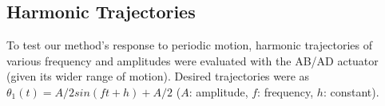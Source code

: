 \documentclass[letterpaper, 10pt, conference]{ieeeconf}      %
\begin{document}
\begin{table}[!t]
\vspace{6pt}
\caption{MSE (SDE) for Joint Angles $\theta_1$ and $\theta_2$ during Single Actuator Operation}
\vspace{-6pt}
\label{table:mse_1}
\vspace{-6pt}
\end{table}


\begin{table}[!t]
\vspace{4pt}
\caption{MSE (SDE) for Joint Angles $\theta_1$ and $\theta_2$ during Simultaneous Actuator Operation}
\vspace{-6pt}
\label{table:mse_2}
\vspace{-9pt}
\end{table}




\subsection{Harmonic Trajectories}
To test our method's response to periodic motion, harmonic trajectories of various frequency and amplitudes were evaluated with the AB/AD actuator (given its wider range of motion). Desired trajectories were as  
%
       $\theta_1(t) = A/2sin(ft+h) + A/2$ %
%
($A$: amplitude, $f$: frequency, $h$: constant). 
\end{document}
